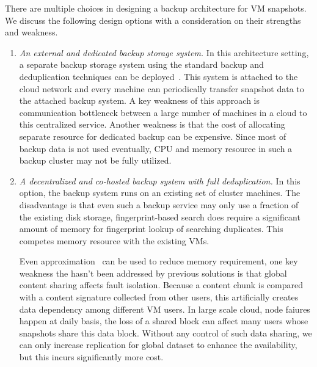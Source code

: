 There are multiple choices in designing a backup architecture  for VM snapshots.
We discuss the following design options with a consideration on their strengths and weakness.
\begin{enumerate}
\item  {\em An external and dedicated backup storage system.} 
In this architecture setting, a separate backup storage system using
the standard backup and deduplication techniques can be deployed~\cite{bottleneck08,extreme_binning09,sparseindex09}. 
This system is attached to the cloud network and every machine can periodically transfer snapshot data to 
the attached backup system. 
A key weakness of this approach is communication bottleneck between a large number of machines
in a cloud to this centralized  service.
Another weakness is that the cost of allocating separate resource for dedicated backup  can be expensive.
Since most of backup data is not used eventually, CPU and memory resource in such a backup cluster may not be fully utilized.
\item {\em A decentralized and co-hosted backup system with full deduplication.}
In this option, the backup system runs on an existing set of cluster machines.
The disadvantage is that 
even such a  backup service may only use  a fraction of the existing disk storage, 
fingerprint-based search does require a significant amount of memory for fingerprint lookup of searching duplicates.
This competes memory resource  with the existing VMs.

Even approximation~\cite{extreme_binning09,sparseindex09} can be used to reduce memory requirement,
one key weakness the hasn't been addressed by previous solutions is that global content sharing affects
fault isolation.
Because a content chunk is compared with a content signature collected from other users,
this artificially creates data dependency among different VM users.
In large scale cloud, node faiures happen at daily basis,
the loss of a shared block can affect many users whose snapshots share this 
data block. 
Without any control of such data sharing, we can only increase  
replication for global dataset to enhance the availability,
but this incurs significantly more cost.


\end{enumerate}
